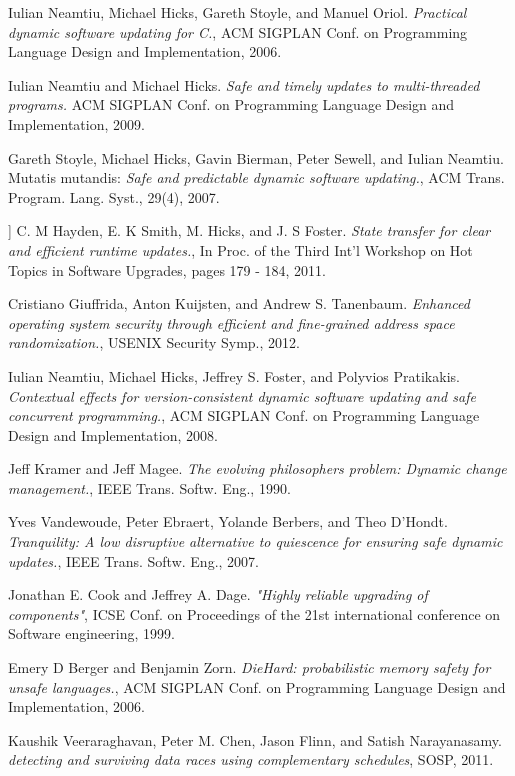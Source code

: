 \documentclass[a4paper,11pt,twoside]{report}
\begin{document}
\begin{thebibliography}{1}
   Iulian Neamtiu, Michael Hicks, Gareth Stoyle, and Manuel Oriol. {\em Practical dynamic software updating for C.}, ACM SIGPLAN Conf. on Programming Language Design and Implementation, 2006.

   Iulian Neamtiu and Michael Hicks. {\em Safe and timely updates to multi-threaded programs.} ACM SIGPLAN Conf. on Programming Language Design and Implementation,  2009.

   Gareth Stoyle, Michael Hicks, Gavin Bierman, Peter Sewell, and Iulian Neamtiu. Mutatis mutandis: {\em Safe and predictable dynamic software updating.}, ACM Trans. Program. Lang. Syst., 29(4), 2007.
  
   ] C. M Hayden, E. K Smith, M. Hicks, and J. S Foster. {\em State transfer for clear and efficient runtime updates.}, In Proc. of the Third Int'l Workshop on Hot Topics in Software Upgrades, pages 179 - 184, 2011.

   Cristiano Giuffrida, Anton Kuijsten, and Andrew S. Tanenbaum. {\em Enhanced operating system security through efficient and fine-grained address space randomization.}, USENIX Security Symp., 2012.

   Iulian Neamtiu, Michael Hicks, Jeffrey S. Foster, and Polyvios Pratikakis. {\em Contextual effects for version-consistent dynamic software updating and safe concurrent programming.}, ACM SIGPLAN Conf. on Programming Language Design and Implementation, 2008. 

   Jeff Kramer and Jeff Magee. {\em The evolving philosophers problem: Dynamic change management.}, IEEE Trans. Softw. Eng., 1990. 

  Yves Vandewoude, Peter Ebraert, Yolande Berbers, and Theo D'Hondt. {\em Tranquility: A low disruptive alternative to quiescence for ensuring safe dynamic updates.}, IEEE Trans. Softw. Eng., 2007.

  Jonathan E. Cook and	Jeffrey A. Dage. {\em "Highly reliable upgrading of components"}, ICSE Conf. on Proceedings of the 21st international conference on Software engineering, 1999.

  Emery D Berger and Benjamin Zorn. {\em DieHard: probabilistic memory safety for unsafe languages.}, ACM SIGPLAN Conf. on Programming Language Design and Implementation, 2006.
 
  Kaushik Veeraraghavan, Peter M. Chen, Jason Flinn, and Satish Narayanasamy. {\em detecting and surviving data races using complementary schedules}, SOSP, 2011. 
 

\end{thebibliography}
\end{document}

